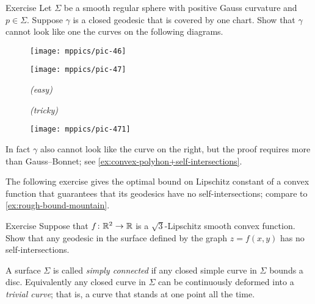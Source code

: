 \begin{thm}{Exercise}\label{ex:self-intersections}
Let $\Sigma$ be a smooth regular sphere with positive Gauss curvature and $p\in\Sigma$. 
Suppose $\gamma$ is a closed geodesic that is covered by one chart.
Show that $\gamma$ cannot look like one the curves on the following diagrams.

\begin{figure}[h]
\begin{minipage}{.48\textwidth}
\centering
\texttt{[image: mppics/pic-46]}
\end{minipage}
\hfill
\begin{minipage}{.48\textwidth}
\centering
\texttt{[image: mppics/pic-47]}
\end{minipage}

\medskip

\begin{minipage}{.48\textwidth}
\centering
\caption*{\textit{(easy)}}
\end{minipage}\hfill
\begin{minipage}{.48\textwidth}
\centering
\caption*{\textit{(tricky)}}
\end{minipage}
\vskip-4mm
\end{figure}

\end{thm}


\begin{wrapfigure}{r}{30 mm}
\vskip-0mm
\centering
\texttt{[image: mppics/pic-471]}
\end{wrapfigure}

In fact $\gamma$ also cannot look like the curve on the right, but the proof requires more than Gauss--Bonnet; see \ref{ex:convex-polyhon+self-intersections}.

The following exercise gives the optimal bound on Lipschitz constant of a convex function that guarantees that its geodesics have no self-intersections;
compare to \ref{ex:rough-bound-mountain}.

\begin{thm}{Exercise}\label{ex:sqrt(3)}
Suppose that $f\colon\mathbb{R}^2\to\mathbb{R}$ is a $\sqrt{3}$-Lipschitz smooth convex function.
Show that any geodesic in the surface defined by the graph $z=f(x,y)$ has no self-intersections.
\end{thm}

A surface $\Sigma$ is called \emph{simply connected} if any closed simple curve in $\Sigma$ bounds a disc.
Equivalently any closed curve in $\Sigma$ can be continuously deformed into a \emph{trivial curve}; that is, a curve that stands at one point all the time.

